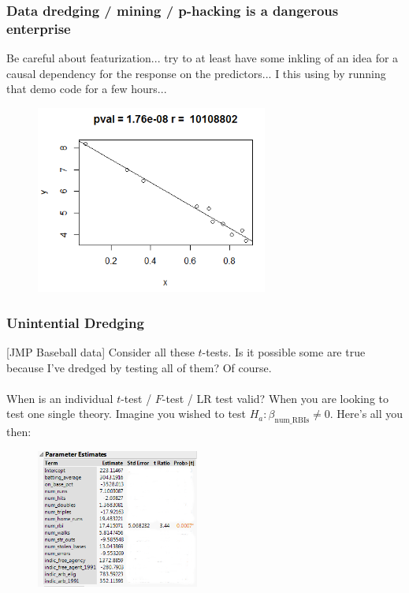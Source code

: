 \documentclass[slides]{beamer} %
\begin{document}
\begin{frame}\frametitle{Data dredging / mining / p-hacking is a dangerous enterprise}

\small
Be careful about featurization... try to at least have some inkling of an idea for a causal dependency for the response on the predictors... \pause I  this using by running that demo code for a few hours...
 
\begin{figure}
\centering
\includegraphics[width=3in]{data_mining.png}
\end{figure}
	
\end{frame}

\begin{frame}\frametitle{Unintential Dredging}
\small
[JMP Baseball data] \pause Consider all these $t$-tests. Is it possible some are true because I've dredged by testing all of them? \pause Of course. \\~\\

\pause When is an individual $t$-test / $F$-test / LR test valid? \pause When you are looking to test one single theory. Imagine you wished to test $H_a: \beta_{\text{num\_RBIs}} \neq 0$. Here's all you  then:

\begin{figure}
\centering
\includegraphics[width=2.1in]{baseball_param_ests.png}
\end{figure}

\end{frame}
\end{document}
